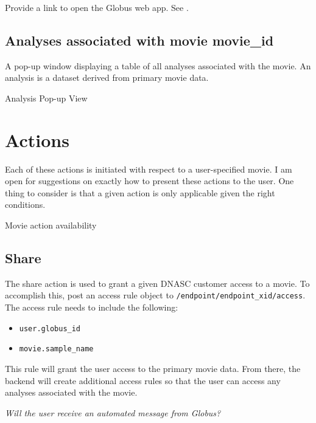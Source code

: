 Provide a link to open the Globus web app. See .

\subsection{Analyses associated with movie movie\_id}

A pop-up window displaying a table of all analyses associated with the movie. An analysis 
is a dataset derived from primary movie data.

\begin{table}[h]
    \caption{Analysis Pop-up View}
\end{table}

\section{Actions}

Each of these actions is initiated with respect to a user-specified movie. I am open for 
suggestions on exactly how to present these actions to the user. One thing to consider is 
that a given action is only applicable given the right conditions.

\begin{table}[h]
    
    \caption{Movie action availability}
\end{table}

\subsection{Share}

The share action is used to grant a given DNASC customer access to a movie. To accomplish 
this, post an access rule object to \texttt{/endpoint/endpoint\_xid/access}. The access rule 
needs to include the following:

\begin{itemize}
    \item \texttt{user.globus\_id}
    \item \texttt{movie.sample\_name}
\end{itemize}

This rule will grant the user access to the primary movie data. From there, the backend will 
create additional access rules so that the user can access any analyses associated with the 
movie.

\emph{Will the user receive an automated message from Globus?}

